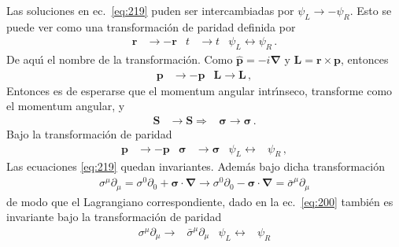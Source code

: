 Las soluciones en ec.~\eqref{eq:219} puden ser intercambiadas por $\psi_L\to -\psi_R$. Esto se puede ver como una transformaci\'on de paridad definida por
\begin{align}
  \mathbf{r}&\to-\mathbf{r}& t&\to t& \psi_L\leftrightarrow \psi_R\,.
\end{align}
De aqu\'\i{} el nombre de la transformaci\'on. Como $\hat{\mathbf{p}}=-i\boldsymbol{\nabla}$ y $\mathbf{L}=\mathbf{r}\times\mathbf{p}$, entonces
\begin{align}
  \mathbf{p}&\to-\mathbf{p}& \mathbf{L}\to\mathbf{L}\,,
\end{align}
Entonces es de esperarse que el momentum angular intr\'\i nseco, transforme como el momentum angular, y
\begin{align}
  \mathbf{S}&\to \mathbf{S}\Rightarrow& \boldsymbol{\sigma}\to\boldsymbol{\sigma}\,.
\end{align}
Bajo la transformaci\'on de paridad
\begin{align}
   \mathbf{p}&\to-\mathbf{p}& \boldsymbol{\sigma}&\to \boldsymbol{\sigma}& \psi_L\leftrightarrow &\psi_R\,,
\end{align}
Las ecuaciones \eqref{eq:219} quedan invariantes. Adem\'as bajo dicha transformaci\'on
\begin{align}
  \sigma^\mu\partial_\mu=\sigma^0\partial_0+\boldsymbol{\sigma}\cdot\boldsymbol{\nabla}\to \sigma^0\partial_0-\boldsymbol{\sigma}\cdot\boldsymbol{\nabla}=\bar{\sigma}^\mu\partial_\mu
\end{align}
de modo que el Lagrangiano correspondiente, dado en la ec.~\eqref{eq:200} tambi\'en es invariante bajo la transformaci\'on de paridad
\begin{align}
  \sigma^\mu\partial_\mu\to& \bar{\sigma}^\mu\partial_\mu &\psi_L\leftrightarrow &\psi_R
\end{align}





